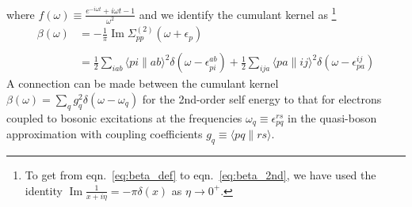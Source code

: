where $f(\omega) \equiv \frac{e^{-i \omega t}+i \omega t-1}{\omega^2} $ and we identify the cumulant kernel as
\footnote{To get from eqn.~\ref{eq:beta_def} to eqn.~\ref{eq:beta_2nd}, we have used the identity $\operatorname{Im} \frac{1}{x + i \eta} = -\pi \delta(x)$ as $\eta \to 0^+$.}
\begin{align}
    \beta(\omega) &= -\frac{1}{\pi} \operatorname{Im} \Sigma_{pp}^{(2)}\left(\omega+\epsilon_p\right) 
\label{eq:beta_def}\\
\\
&=\frac{1}{2} \sum_{i a b}\langle p i \| a b\rangle^2 \delta\left(\omega-\epsilon_{p i}^{a b}\right)+\frac{1}{2} \sum_{i j a}\langle p a \| i j\rangle^2 \delta\left(\omega-\epsilon_{p a}^{i j}\right) \label{eq:beta_2nd}
\end{align}
A connection can be made between the cumulant kernel $\beta(\omega)=\sum_q g_q^2 \delta(\omega-\omega_q)$ for the 2nd-order self energy  to that for electrons coupled to
bosonic excitations at the frequencies $\omega_q\equiv \epsilon_{pq}^{rs}$ in the quasi-boson approximation
with coupling coefficients $g_q \equiv \langle p q \| r s\rangle$.
